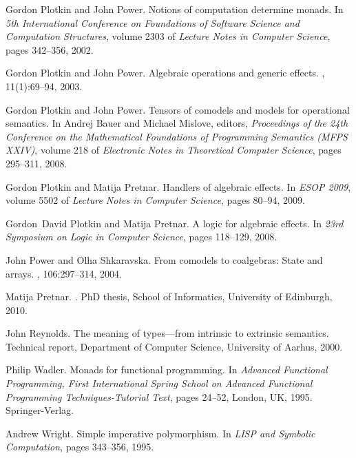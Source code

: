 \documentclass[12pt]{article}
\begin{document}
\begin{thebibliography}{10}
Gordon Plotkin and John Power.
\newblock Notions of computation determine monads.
\newblock In {\em 5th International Conference on Foundations of Software
  Science and Computation Structures}, volume 2303 of {\em Lecture Notes in
  Computer Science}, pages 342--356, 2002.

Gordon Plotkin and John Power.
\newblock Algebraic operations and generic effects.
, 11(1):69--94, 2003.

Gordon Plotkin and John Power.
\newblock Tensors of comodels and models for operational semantics.
\newblock In Andrej Bauer and Michael Mislove, editors, {\em Proceedings of the
  24th Conference on the Mathematical Foundations of Programming Semantics
  (MFPS XXIV)}, volume 218 of {\em Electronic Notes in Theoretical Computer
  Science}, pages 295--311, 2008.

Gordon Plotkin and Matija Pretnar.
\newblock Handlers of algebraic effects.
\newblock In {\em ESOP 2009}, volume 5502 of {\em Lecture Notes in Computer
  Science}, pages 80--94, 2009.

Gordon~David Plotkin and Matija Pretnar.
\newblock A logic for algebraic effects.
\newblock In {\em 23rd Symposium on Logic in Computer Science}, pages 118--129,
  2008.

John Power and Olha Shkaravska.
\newblock From comodels to coalgebras: State and arrays.
, 106:297--314,
  2004.

Matija Pretnar.
.
\newblock PhD thesis, School of Informatics, University of Edinburgh, 2010.

John Reynolds.
\newblock The meaning of types---from intrinsic to extrinsic semantics.
\newblock Technical report, Department of Computer Science, University of
  Aarhus, 2000.

Philip Wadler.
\newblock Monads for functional programming.
\newblock In {\em Advanced Functional Programming, First International Spring
  School on Advanced Functional Programming Techniques-Tutorial Text}, pages
  24--52, London, UK, 1995. Springer-Verlag.

Andrew Wright.
\newblock Simple imperative polymorphism.
\newblock In {\em LISP and Symbolic Computation}, pages 343--356, 1995.

\end{thebibliography}


\end{document}
